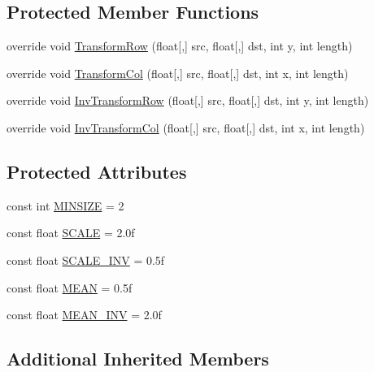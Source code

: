 \subsection*{Protected Member Functions}
\begin{DoxyCompactItemize}
\item 
override void \hyperlink{class_turbo_wavelets_1_1_haar_wavelet2_d_a55f6abb99bf5d87017e715b63f64cc15}{Transform\+Row} (float\mbox{[},\mbox{]} src, float\mbox{[},\mbox{]} dst, int y, int length)
\item 
override void \hyperlink{class_turbo_wavelets_1_1_haar_wavelet2_d_a5695f7a35bbbae2f64d5c92212cd1f83}{Transform\+Col} (float\mbox{[},\mbox{]} src, float\mbox{[},\mbox{]} dst, int x, int length)
\item 
override void \hyperlink{class_turbo_wavelets_1_1_haar_wavelet2_d_a870ff202a886a34c54013b867e56f6e6}{Inv\+Transform\+Row} (float\mbox{[},\mbox{]} src, float\mbox{[},\mbox{]} dst, int y, int length)
\item 
override void \hyperlink{class_turbo_wavelets_1_1_haar_wavelet2_d_a780d0ea14dea6a587c8ebf21f19670d0}{Inv\+Transform\+Col} (float\mbox{[},\mbox{]} src, float\mbox{[},\mbox{]} dst, int x, int length)
\end{DoxyCompactItemize}
\subsection*{Protected Attributes}
\begin{DoxyCompactItemize}
\item 
const int \hyperlink{class_turbo_wavelets_1_1_haar_wavelet2_d_a841ed0ce87560b5a4e5b94e4b2630765}{M\+I\+N\+S\+I\+Z\+E} = 2
\item 
const float \hyperlink{class_turbo_wavelets_1_1_haar_wavelet2_d_a1c6cc94e0c41dd74fc3c8f7e36bf123f}{S\+C\+A\+L\+E} = 2.\+0f
\item 
const float \hyperlink{class_turbo_wavelets_1_1_haar_wavelet2_d_adbc2c681478c8bd315a77b6ddf57e9bd}{S\+C\+A\+L\+E\+\_\+\+I\+N\+V} = 0.\+5f
\item 
const float \hyperlink{class_turbo_wavelets_1_1_haar_wavelet2_d_af0a09712e36a5e8abcaf67e9352c7529}{M\+E\+A\+N} = 0.\+5f
\item 
const float \hyperlink{class_turbo_wavelets_1_1_haar_wavelet2_d_aca358f40b15421e2ad216236fa000cce}{M\+E\+A\+N\+\_\+\+I\+N\+V} = 2.\+0f
\end{DoxyCompactItemize}
\subsection*{Additional Inherited Members}


